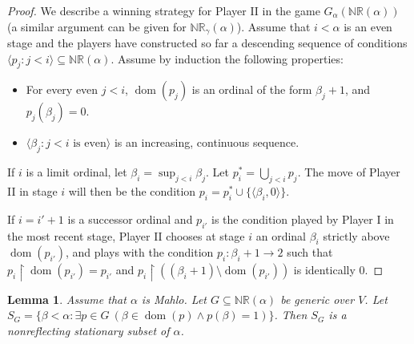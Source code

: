 \documentclass[11pt]{amsart}
\renewcommand{\restriction}{\mathbin\upharpoonright}    %
\newtheorem{lemma}[theorem]{Lemma}
\theoremstyle{definition}
\newcounter{condition}
\theoremstyle{remark}
\newcommand\<{{<}}
\newcommand{\dom}{\mathop{\mathrm{dom}}\nolimits}
\newcommand{\la}{\langle}
\newcommand{\ra}{\rangle}
\begin{document}
   \begin{proof}
    We describe a winning strategy for Player II in the game $G_\alpha(\mathbb{NR}(\alpha))$ (a similar argument can be given for $\mathbb{NR}_\gamma(\alpha)$). Assume that $i<\alpha$ is an even stage and the players have constructed so far a descending sequence of conditions $\la p_j \colon j<i \ra\subseteq \mathbb{NR}(\alpha)$. Assume by induction the following properties:
    \begin{itemize}
        \item For every even $j<i$, $\dom(p_j)$ is an ordinal of the form $\beta_j+1$, and $p_j(\beta_j) =0$.
        \item $\la \beta_j \colon j<i \text{ is even} \ra$ is an increasing, continuous sequence.
        \end{itemize}
    If $i$ is a limit ordinal, let $\beta_i = \sup_{j<i} \beta_j$. Let $p^*_i = \bigcup_{j<i}p_j$. The move of Player II in stage $i$ will then be the condition $p_i = p^*_i \cup \{ \la \beta_i, 0 \ra \}$. 
           
    If $i = i'+1$ is a successor ordinal and $p_{i'}$ is the condition played by Player I in the most recent stage, Player II chooses at stage $i$ an ordinal $\beta_{i}$ strictly above $\dom(p_{i'})$, and plays with the condition $p_{i}\colon \beta_{i}+1\to 2$ such that $p_{i}\restriction \dom(p_{i'}) = p_{i'}$ and $p_{i}\restriction \left((\beta_{i}+1) \setminus \dom(p_{i'})\right)$ is identically $0$.
   \end{proof}
    

     \begin{lemma}\label{lemma: NR adds a nonreflecting stationary set}
        Assume that $\alpha$ is Mahlo. Let $G\subseteq \mathbb{NR}(\alpha)$ be generic over $V$. Let $S_G = \{ \beta<\alpha \colon \exists p\in G \ (\beta\in \dom(p) \land  p(\beta)= 1) \}$. Then $S_G$ is a nonreflecting stationary subset of $\alpha$.
    \end{lemma}
\end{document}
